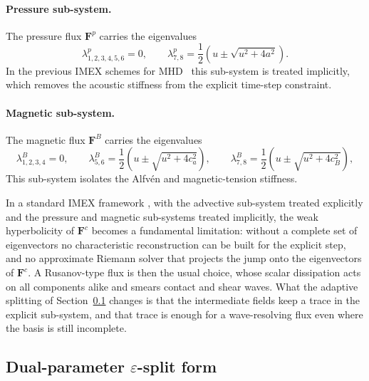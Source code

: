 \documentclass[a4paper,fleqn]{cas-sc}
\theoremstyle{remark}
\newcommand{\eps}{\varepsilon}
\begin{document}
\paragraph{Pressure sub-system.}
The pressure flux $\mathbf{F}^p$ carries the eigenvalues
\begin{equation}
\label{eq:p_eigs}
\lambda^p_{1,2,3,4,5,6}=0,\qquad
\lambda^p_{7,8}=\frac{1}{2}\left(u\pm\sqrt{u^2+4a^2}\right).
\end{equation}
In the previous IMEX schemes for MHD~\cite{Fambri2021,MHDIMEX}
this sub-system is treated implicitly, which removes the acoustic stiffness
from the explicit time-step constraint.

\paragraph{Magnetic sub-system.}
The magnetic flux $\mathbf{F}^B$ carries the eigenvalues
\begin{equation}
\label{eq:B_eigs}
\lambda^B_{1,2,3,4}=0,\qquad
\lambda^B_{5,6}=\frac{1}{2}\left(u\pm\sqrt{u^2+4c_a^2}\right),\qquad
\lambda^B_{7,8}=\frac{1}{2}\left(u\pm\sqrt{u^2+4c_B^2}\right),
\end{equation}
This sub-system isolates the Alfvén and magnetic-tension stiffness.

In a standard IMEX framework \cite{MHDIMEX}, with the advective sub-system
treated explicitly and the pressure and magnetic sub-systems treated implicitly,
the weak hyperbolicity of $\mathbf{F}^c$ becomes a fundamental limitation:
without a complete set of eigenvectors no characteristic reconstruction can be
built for the explicit step, and no approximate Riemann solver that projects the
jump onto the eigenvectors of $\mathbf{F}^c$. A Rusanov-type flux is then the
usual choice, whose scalar dissipation acts on all components alike and smears
contact and shear waves. What the adaptive splitting of
Section~\ref{sec:eps_split} changes is that the intermediate fields keep a
trace in the explicit sub-system, and that trace is enough for a
wave-resolving flux even where the basis is still incomplete.
 
\subsection{Dual-parameter $\eps$-split form}
\label{sec:eps_split}
\end{document}

